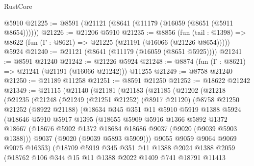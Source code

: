 \begin{lexlean}{RustCore}
\begin{coremodule}
    @5910
@21225 := @8591 (@21121 (@8641 (@11179 (@16059 (@8651 (@5911 @8654))))))
@21226 := @21206 @5910
@21235 := @8856
    (fun (tail : @1398) => @8622 (fun (Γ : @8621) => @21225 (@21191 (@16066 (@21226 @8654)))))
    @5924
@21240 := @21121 (@8641 (@11179 (@16059 (@8651 @5925))))
@21241 := @8591 @21240
@21242 := @21226 @5924
@21248 := @8874 (fun (Γ : @8621) => @21241 (@21191 (@16066 @21242))) @11255
@21249 := @8758 @21240
@21250 := @21189 @11258
@21251 := @8591 @21250
@21252 := @18622 @21242
@21349 := @21115
    (@21140
      (@21181
        (@21183
          (@21185
            (@21202
              (@21218
                (@21235
                  (@21248
                    (@21249
                      (@21251 @21252)
                      (@8917 @21120)
                      (@8758
                        @21250
                        @21252
                        (@8922 @21188)
                        (@18634
                          @345
                          @351
                          @11
                          @5910
                          @5919
                          @1388
                          @5924
                          (@18646
                            @5910
                            @5917
                            @1395
                            (@18655
                              @5909
                              @5916
                              @1366
                              @5892
                              @1372
                              @18667
                              (@18676 @5902 @1372 @18684 @18686 @9037 (@9020 (@9039 @5903 @1388)))
                              @9037
                              (@9020 (@9039 @5893 @5909)))
                            @9055
                            @9059
                            @9064
                            @9069
                            @9075
                            @16353)
                          (@18709
                            @5919
                            @345
                            @351
                            @11
                            @1388
                            @2024
                            @1388
                            @2059
                            (@18762
                              @106
                              @344
                              @15
                              @11
                              @1388
                              @2022
                              @1409
                              @741
                              @18791
                              @11413

\end{coremodule}
\end{lexlean}
